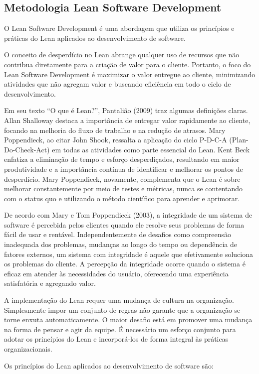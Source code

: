 \subsection{Metodologia Lean Software Development}
O Lean Software Development é uma abordagem que utiliza os princípios e práticas do Lean aplicados ao desenvolvimento de software.

O conceito de desperdício no Lean abrange qualquer uso de recursos que não contribua diretamente para a criação de valor para o cliente. Portanto, o foco do Lean Software Development é maximizar o valor entregue ao cliente, minimizando atividades que não agregam valor e buscando eficiência em todo o ciclo de desenvolvimento.

Em seu texto “O que é Lean?”, Pantalião (2009) traz algumas definições claras. Allan Shalloway destaca a importância de entregar valor rapidamente ao cliente, focando na melhoria do fluxo de trabalho e na redução de atrasos. Mary Poppendieck, ao citar John Shook, ressalta a aplicação do ciclo P-D-C-A (Plan-Do-Check-Act) em todas as atividades como parte essencial do Lean. Kent Beck enfatiza a eliminação de tempo e esforço desperdiçados, resultando em maior produtividade e a importância contínua de identificar e melhorar os pontos de desperdício. Mary Poppendieck, novamente, complementa que o Lean é sobre melhorar constantemente por meio de testes e métricas, nunca se contentando com o status quo e utilizando o método científico para aprender e aprimorar.

De acordo com Mary e Tom Poppendieck (2003), a integridade de um sistema de software é percebida pelos clientes quando ele resolve seus problemas de forma fácil de usar e rentável. Independentemente de desafios como compreensão inadequada dos problemas, mudanças ao longo do tempo ou dependência de fatores externos, um sistema com integridade é aquele que efetivamente soluciona os problemas do cliente. A percepção da integridade ocorre quando o sistema é eficaz em atender às necessidades do usuário, oferecendo uma experiência satisfatória e agregando valor.

A implementação do Lean requer uma mudança de cultura na organização. Simplesmente impor um conjunto de regras não garante que a organização se torne enxuta automaticamente. O maior desafio está em promover uma mudança na forma de pensar e agir da equipe. É necessário um esforço conjunto para adotar os princípios do Lean e incorporá-los de forma integral às práticas organizacionais.

Os princípios do Lean aplicados ao desenvolvimento de software são:

